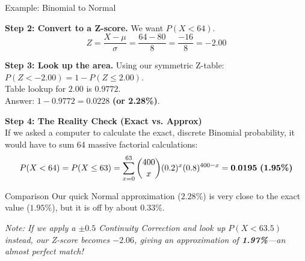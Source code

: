 \begin{frame}[allowframebreaks]{Example: Binomial to Normal}
\begin{solution}
        \vspace{0.2cm}
        \textbf{Step 2: Convert to a Z-score.}
        We want $P(X < 64)$.
        \[ Z = \frac{X - \mu}{\sigma} = \frac{64 - 80}{8} = \frac{-16}{8} = \mathbf{-2.00} \]
        
        \vspace{0.2cm}
        \textbf{Step 3: Look up the area.}
        Using our symmetric Z-table: $P(Z < -2.00) = 1 - P(Z \leq 2.00)$. \\
        Table lookup for $2.00$ is $0.9772$. \\
        Answer: $1 - 0.9772 = \mathbf{0.0228}$ \textbf{(or 2.28\%)}.
    \end{solution}
\end{frame}

\begin{frame}
\begin{solution}
   \textbf{Step 4: The Reality Check (Exact vs. Approx)} \\
        If we asked a computer to calculate the exact, discrete Binomial probability, it would have to sum 64 massive factorial calculations:
        \[ P(X < 64) = P(X \leq 63) = \sum_{x=0}^{63} \binom{400}{x} (0.2)^x (0.8)^{400-x} = \mathbf{0.0195} \text{ \textbf{(1.95\%)}} \]
        
        \vspace{0.1cm}
        \begin{block}{Comparison}
            Our quick Normal approximation ($2.28\%$) is very close to the exact value ($1.95\%$), but it is off by about $0.33\%$. 
            
            \textit{Note: If we apply a $\pm 0.5$ Continuity Correction and look up $P(X < 63.5)$ instead, our Z-score becomes $-2.06$, giving an approximation of \textbf{1.97\%}—an almost perfect match!}
        \end{block}
    \end{solution}


\end{frame}

